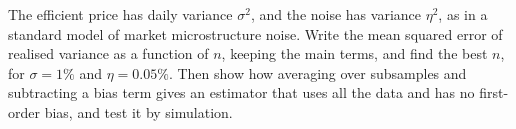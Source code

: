 \begin{question}\label{iq:iv1:time-series:20}
The efficient price has daily variance $\sigma^2$, and the noise has variance $\eta^2$, as in a standard model of market microstructure noise. Write the mean squared error of realised variance as a function of $n$, keeping the main terms, and find the best $n$, for $\sigma = 1\%$ and $\eta = 0.05\%$. Then show how averaging over subsamples and subtracting a bias term gives an estimator that uses all the data and has no first-order bias, and test it by simulation.
\end{question}
